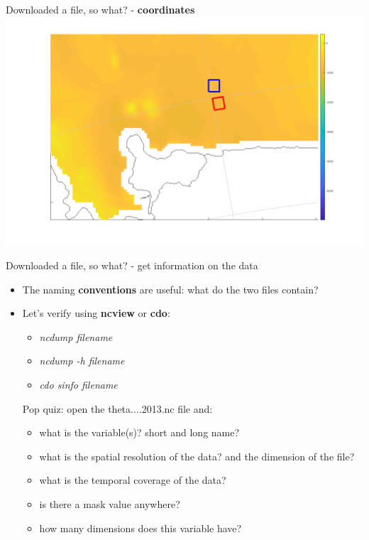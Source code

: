 \begin{frame}{\insertsectionnumber{ |} Downloaded a file, so what? - \textbf{coordinates}}
    \includegraphics[scale=0.25]{images/winter_school_domain_3_2.png}
\end{frame}

\begin{frame}{\insertsectionnumber{ |} Downloaded a file, so what? - get information on the data}
    \begin{itemize}
        \item The naming \textbf{conventions} are useful: what do the two files contain?\\
            \vspace{0.5cm}
        \item Let's verify using \textbf{ncview} or \textbf{cdo}: \\
            \begin{itemize}
                \item \textit{ncdump filename} 
                \item \textit{ncdump -h filename} 
                \item \textit{cdo sinfo filename} 
            \end{itemize}
        \vspace{2cm}
    \begin{beamerboxesrounded}[lower=gray,shadow=true]{Pop quiz: open the theta....2013.nc file and:
        \begin{itemize}
            \item what is the variable(s)? short and long name?
            \item what is the spatial resolution of the data? and the dimension of the file?
            \item what is the temporal coverage of the data?
         \item is there a mask value anywhere? 
         \item how many dimensions does this variable have?
        \end{itemize}
        }
    \end{beamerboxesrounded}
    \end{itemize}
\end{frame}
 

